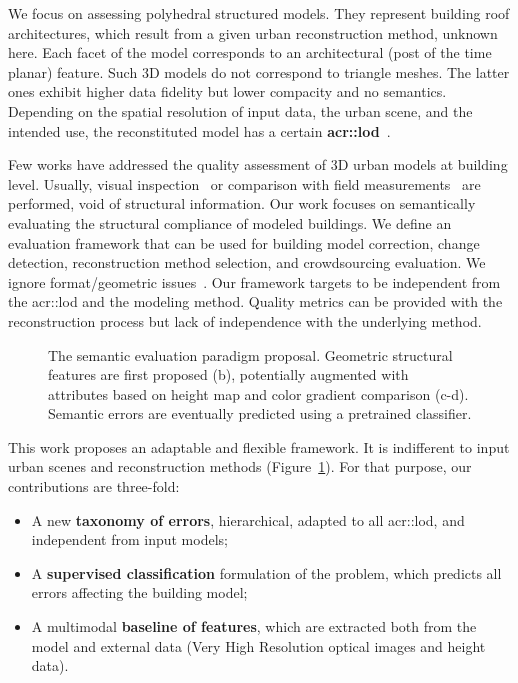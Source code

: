 \documentclass[conference]{IEEEtran}
\begin{document}
    We focus on assessing polyhedral structured models. They represent building roof architectures, which result from a given urban reconstruction method, unknown here. Each facet of the model corresponds to an architectural (post of the time planar) feature. Such 3D models do not correspond to triangle meshes. The latter ones exhibit higher data fidelity but lower compacity and no semantics. Depending on the spatial resolution of input data, the urban scene, and the intended use, the reconstituted model has a certain \textbf{\gls{acr::lod}}~\cite{kolbe2005citygml}.
    
    Few works have addressed the quality assessment of 3D urban models at building level. Usually, visual inspection~\cite{Durupt2006} or comparison with field measurements~\cite{Kaartinen2005} are performed, void of structural information. Our work focuses on semantically evaluating the structural compliance of modeled buildings. We define an evaluation framework that can be used for building model correction, change detection, reconstruction method selection, and crowdsourcing evaluation. We ignore format/geometric issues~\cite{ledoux2018val3dity}. Our framework targets to be independent from the \acrlong{acr::lod} and the modeling method. Quality metrics can be provided with the reconstruction process but lack of independence with the underlying method. 

	\begin{figure}
        \begin{center}
            
            \vspace{-1.3cm}
            \caption{\label{fig::pipeline} The semantic evaluation paradigm proposal. Geometric structural features are first proposed (b), potentially augmented with attributes based on height map and color gradient comparison (c-d). Semantic errors are eventually predicted using a pretrained classifier.}
        \end{center}
    \end{figure}

     This work proposes an adaptable and flexible framework. It is indifferent to input urban scenes and reconstruction methods (Figure~\ref{fig::pipeline}). For that purpose, our contributions are three-fold:
    \begin{itemize}
        \item A new \textbf{taxonomy of errors}, hierarchical, adapted to all \acrshort{acr::lod}, and independent from input models;
        \item A \textbf{supervised classification} formulation of the problem, which predicts all errors affecting the building model;
        \item A multimodal \textbf{baseline of features}, which are extracted both from the model and external data (Very High Resolution optical images and height data).
    \end{itemize}
\end{document}
